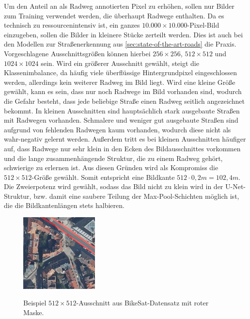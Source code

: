 Um den Anteil an als Radweg annotierten Pixel zu erhöhen, sollen nur Bilder zum Training verwendet werden,
die überhaupt Radwege enthalten. Da es technisch zu ressourcenintensiv ist, ein ganzes 
$10.000{\times}10.000$-Pixel-Bild einzugeben, sollen die Bilder in kleinere Stücke zerteilt werden. 
Dies ist auch bei den Modellen zur Straßenerkennung aus \autoref{sec:state-of-the-art-roads} die Praxis. 
Vorgeschlagene Ausschnittsgrößen können hierbei $256{\times}256$, $512{\times}512$ und $1024{\times}1024$ sein. 
Wird ein größerer Ausschnitt gewählt, steigt die Klassenimbalance, da häufig viele überflüssige 
Hintergrundpixel eingeschlossen werden, allerdings kein weiterer Radweg im Bild liegt. 
Wird eine kleine Größe gewählt, kann es sein, dass nur noch Radwege im Bild vorhanden sind, 
wodurch die Gefahr besteht, dass jede beliebige Straße einen Radweg seitlich angezeichnet bekommt. 
In kleinen Ausschnitten sind hauptsächlich stark ausgebaute Straßen mit Radwegen vorhanden. 
Schmalere und weniger gut ausgebaute Straßen sind aufgrund von fehlenden Radwegen kaum vorhanden, wodurch diese nicht als wahr-negativ gelernt werden.  
Außerdem tritt es bei kleinen Ausschnitten häufiger auf, dass Radwege nur sehr klein in den Ecken des Bildausschnittes
vorkommen und die lange zusammenhängende Struktur, die zu einem Radweg gehört, schwierige zu erlernen ist. 
Aus diesen Gründen wird als Kompromiss die $512{\times}512$-Größe gewählt. Somit entspricht eine Bildkante 
$512 \cdot 0,2m = 102,4m$. Die Zweierpotenz wird gewählt, 
sodass das Bild nicht zu klein wird in der U-Net-Struktur, bzw. damit eine saubere Teilung der 
Max-Pool-Schichten möglich ist, die die Bildkantenlängen stets halbieren. 

\begin{figure}
	\centering
	\vspace{-20pt} %
	\includegraphics[width=0.35\textwidth]{Bilder/cut-example.jpg}
	\vspace{-5pt}
	\caption[Beispiel $512{\times}512$-Ausschnitt aus BikeSat-Datensatz mit roter Maske.]{\unskip}
	Beispiel $512{\times}512$-Ausschnitt aus BikeSat-Datensatz mit roter Maske.
	\label{fig:cut-example}
	\vspace{-20pt}
\end{figure}

